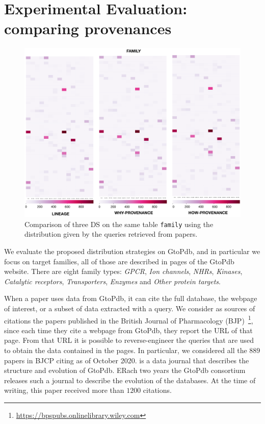 \section{Experimental Evaluation: comparing provenances}
\label{sec:experiments}

\begin{figure}[t]
  \includegraphics[width=1\textwidth]{figures/paper_based}
  \caption{Comparison of three DS on the same table \texttt{family} using the distribution given by the queries retrieved from papers.}
  \label{figure:comparison_on_papers}
\end{figure}


We evaluate the proposed distribution strategies on GtoPdb, and in particular we focus on target families, all of those are described in pages of the GtoPdb website. 
There are eight family types: \emph{GPCR}, \emph{Ion channels}, \emph{NHRs}, \emph{Kinases}, \emph{Catalytic receptors}, \emph{Transporters}, \emph{Enzymes} and \emph{Other protein targets}.  

When a paper uses data from GtoPdb, it can cite the full database, the webpage of interest, or a subset of data extracted with a query. 
We consider as sources of citations the papers published in the British Journal of Pharmacology (BJP)~\footnote{\url{https://bpspubs.onlinelibrary.wiley.com}}, since each time they cite a webpage from GtoPdb, they report the URL of that page. From that URL it is possible to reverse-engineer the queries that are used to obtain the data contained in the pages. 
In particular, we considered all the $889$ papers in BJCP citing \citep{iuphar2018} as of October 2020. \citep{iuphar2018} is a data journal that describes the structure and evolution of GtoPdb. ERach two years the GtoPdb consortium releases such a journal to describe the evolution of the databases.
At the time of writing, this paper received more than $1200$ citations. 

